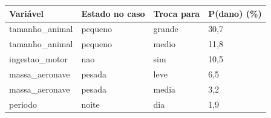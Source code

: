 \begin{tabular}{llll}
\toprule
Variável & Estado no caso & Troca para & P(dano) (\%) \\
\midrule
tamanho\_animal & pequeno & grande & 30,7 \\
tamanho\_animal & pequeno & medio & 11,8 \\
ingestao\_motor & nao & sim & 10,5 \\
massa\_aeronave & pesada & leve & 6,5 \\
massa\_aeronave & pesada & media & 3,2 \\
periodo & noite & dia & 1,9 \\
\bottomrule
\end{tabular}
